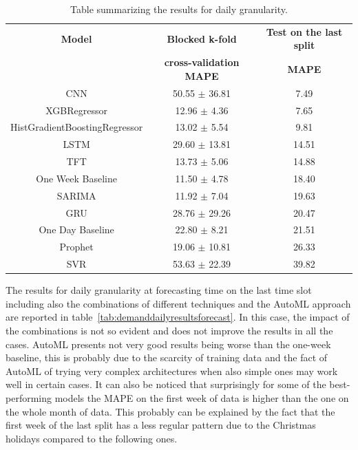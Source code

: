 \begin{table}[H]
\centering
\begin{tabular}{|c|c|c|}
\hline
\textbf{Model} & \textbf{Blocked k-fold} & \textbf{Test on the last split}\\
 & \textbf{cross-validation MAPE} & \textbf{MAPE}\\
\hline
CNN & 50.55 $\pm$ 36.81 & 7.49\\
\hline
XGBRegressor & 12.96 $\pm$ 4.36 & 7.65\\
\hline
HistGradientBoostingRegressor & 13.02 $\pm$ 5.54 & 9.81\\
\hline
LSTM & 29.60 $\pm$ 13.81 & 14.51\\
\hline
TFT & 13.73 $\pm$ 5.06 & 14.88\\
\hline
One Week Baseline & 11.50 $\pm$ 4.78 & 18.40\\
\hline
SARIMA & 11.92 $\pm$ 7.04 & 19.63\\
\hline
GRU & 28.76 $\pm$ 29.26 & 20.47\\
\hline
One Day Baseline & 22.80 $\pm$ 8.21 & 21.51\\
\hline
Prophet & 19.06 $\pm$ 10.81 & 26.33\\
\hline
SVR & 53.63 $\pm$ 22.39 & 39.82\\
\hline
\end{tabular}
\caption{Table summarizing the results for daily granularity.}
\label{tab:demanddailyresults}
\end{table}

The results for daily granularity at forecasting time on the last time slot including also the combinations of different techniques and the AutoML approach are reported in table~\ref{tab:demanddailyresultsforecast}.
In this case, the impact of the combinations is not so evident and does not improve the results in all the cases.
AutoML presents not very good results being worse than the one-week baseline, this is probably due to the scarcity of training data and the fact of AutoML of trying very complex architectures when also simple ones may work well in certain cases.
It can also be noticed that surprisingly for some of the best-performing models the MAPE on the first week of data is higher than the one on the whole month of data.
This probably can be explained by the fact that the first week of the last split has a less regular pattern due to the Christmas holidays compared to the following ones.


